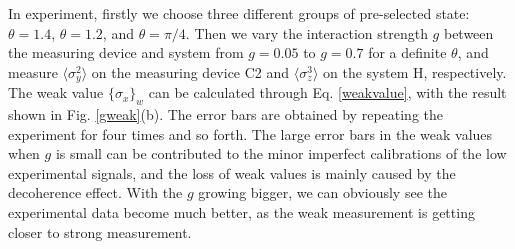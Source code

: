 \documentclass[aps,pra,12pt,onecolumn,showpacs,superscriptaddress,floatfix,footinbib,subfigure]{revtex4}
\begin{document}
In experiment, firstly we choose three different groups of pre-selected state: $\theta = 1.4$, $\theta = 1.2$, and $\theta =\pi/4$. Then we vary the interaction strength $g$ between the measuring device and system from $g=0.05$ to $g = 0.7$ for a definite $\theta$, and measure $\langle \sigma_y^2 \rangle$ on the measuring device C2 and $\langle \sigma_z^3 \rangle$ on the system H, respectively. The weak value $\{ \sigma_x \}_w$ can be calculated through Eq. \ref{weakvalue}, with the result shown in Fig. \ref{gweak}(b). The error bars are obtained by repeating the experiment for four times and so forth. The large error bars in the weak values when $g$ is small can be contributed to the minor imperfect calibrations of the low experimental signals, and the loss of weak values is mainly caused by the decoherence effect. With the $g$ growing bigger, we can obviously see the experimental data become much better, as the weak measurement is getting closer to strong measurement.
\end{document}
